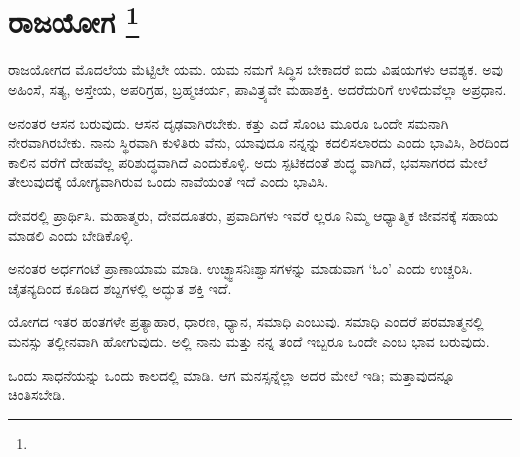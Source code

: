 
\chapter[ರಾಜಯೋಗ ]{ರಾಜಯೋಗ \protect\footnote{}}

ರಾಜಯೋಗದ ಮೊದಲೆಯ ಮೆಟ್ಟಿಲೇ ಯಮ. ಯಮ ನಮಗೆ ಸಿದ್ಧಿಸ ಬೇಕಾದರೆ ಐದು ವಿಷಯಗಳು ಆವಶ್ಯಕ. ಅವು ಅಹಿಂಸೆ, ಸತ್ಯ, ಅಸ್ತೇಯ, ಅಪರಿಗ್ರಹ, ಬ್ರಹ್ಮಚರ್ಯ, ಪಾವಿತ್ರ್ಯವೇ ಮಹಾಶಕ್ತಿ. ಅದರೆದುರಿಗೆ ಉಳಿದುವೆಲ್ಲಾ ಅಪ್ರಧಾನ.

ಅನಂತರ ಆಸನ ಬರುವುದು. ಆಸನ ದೃಢವಾಗಿರಬೇಕು. ಕತ್ತು ಎದೆ ಸೊಂಟ ಮೂರೂ ಒಂದೇ ಸಮನಾಗಿ ನೇರವಾಗಿರಬೇಕು. ನಾನು ಸ್ಥಿರವಾಗಿ ಕುಳಿತಿರು ವೆನು, ಯಾವುದೂ ನನ್ನನ್ನು ಕದಲಿಸಲಾರದು ಎಂದು ಭಾವಿಸಿ, ಶಿರದಿಂದ ಕಾಲಿನ ವರೆಗೆ ದೇಹವೆಲ್ಲ ಪರಿಶುದ್ಧವಾಗಿದೆ ಎಂದುಕೊಳ್ಳಿ. ಅದು ಸ್ಪಟಿಕದಂತೆ ಶುದ್ಧ ವಾಗಿದೆ, ಭವಸಾಗರದ ಮೇಲೆ ತೇಲುವುದಕ್ಕೆ ಯೋಗ್ಯವಾಗಿರುವ ಒಂದು ನಾವೆಯಂತೆ ಇದೆ ಎಂದು ಭಾವಿಸಿ.

ದೇವರಲ್ಲಿ ಪ್ರಾರ್ಥಿಸಿ. ಮಹಾತ್ಮರು, ದೇವದೂತರು, ಪ್ರವಾದಿಗಳು ಇವರೆ ಲ್ಲರೂ ನಿಮ್ಮ ಆಧ್ಯಾತ್ಮಿಕ ಜೀವನಕ್ಕೆ ಸಹಾಯ ಮಾಡಲಿ ಎಂದು ಬೇಡಿಕೊಳ್ಳಿ.

ಅನಂತರ ಅರ್ಧಗಂಟೆ ಪ್ರಾಣಾಯಾಮ ಮಾಡಿ. ಉಚ್ಛ್ವಾಸನಿಃಶ್ವಾಸಗಳನ್ನು ಮಾಡುವಾಗ ‘ಓಂ’ ಎಂದು ಉಚ್ಚರಿಸಿ. ಚೈತನ್ಯದಿಂದ ಕೂಡಿದ ಶಬ್ದಗಳಲ್ಲಿ ಅದ್ಭುತ ಶಕ್ತಿ ಇದೆ.

ಯೋಗದ ಇತರ ಹಂತಗಳೇ ಪ್ರತ್ಯಾಹಾರ, ಧಾರಣ, ಧ್ಯಾನ, ಸಮಾಧಿ ಎಂಬುವು. ಸಮಾಧಿ ಎಂದರೆ ಪರಮಾತ್ಮನಲ್ಲಿ ಮನಸ್ಸು ತಲ್ಲೀನವಾಗಿ ಹೋಗುವುದು. ಅಲ್ಲಿ ನಾನು ಮತ್ತು ನನ್ನ ತಂದೆ ಇಬ್ಬರೂ ಒಂದೇ ಎಂಬ ಭಾವ ಬರುವುದು.

ಒಂದು ಸಾಧನೆಯನ್ನು ಒಂದು ಕಾಲದಲ್ಲಿ ಮಾಡಿ. ಆಗ ಮನಸ್ಸನ್ನೆಲ್ಲಾ ಅದರ ಮೇಲೆ ಇಡಿ; ಮತ್ತಾವುದನ್ನೂ ಚಿಂತಿಸಬೇಡಿ.

